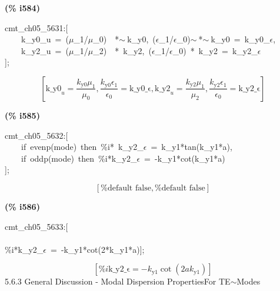 \documentclass[fleqn]{article}
\begin{document}
\noindent
\begin{minipage}[t]{4.000000em}\color{red}\bfseries
(\% i584)	
\end{minipage}
\begin{minipage}[t]{\textwidth}\color{blue}
cmt\_ch05\_5631:[\\
\ \ \ \ k\_y0\_u\ =\ (\ensuremath{\mu}\_1/\ensuremath{\mu}\_0)\ \ *\ensuremath{\sim\ }k\_y0,\ (\ensuremath{\epsilon}\_1/\ensuremath{\epsilon}\_0)\ensuremath{\sim\ }*\ensuremath{\sim\ }k\_y0\ =\ k\_y0\_\ensuremath{\epsilon},\\
\ \ \ \ k\_y2\_u\ =\ (\ensuremath{\mu}\_1/\ensuremath{\mu}\_2)\ \ *\ k\_y2,\ (\ensuremath{\epsilon}\_1/\ensuremath{\epsilon}\_0)\ *\ k\_y2\ =\ k\_y2\_\ensuremath{\epsilon}\\
];
\end{minipage}
\[\displaystyle \tag{\% o584} 
\left[ {{\ensuremath{\mathrm{k\_ y0}}}_u}=\frac{{k_{\ensuremath{\mathrm{y0}}}} {{\mu }_1}}{{{\mu }_0}}\operatorname{,}\frac{{k_{\ensuremath{\mathrm{y0}}}} {{\epsilon }_1}}{{{\epsilon }_0}}=\ensuremath{\mathrm{k\_ y0\_ \epsilon }}\operatorname{,}{{\ensuremath{\mathrm{k\_ y2}}}_u}=\frac{{k_{\ensuremath{\mathrm{y2}}}} {{\mu }_1}}{{{\mu }_2}}\operatorname{,}\frac{{k_{\ensuremath{\mathrm{y2}}}} {{\epsilon }_1}}{{{\epsilon }_0}}=\ensuremath{\mathrm{k\_ y2\_ \epsilon }}\right] \mbox{}
\]


\noindent
\begin{minipage}[t]{4.000000em}\color{red}\bfseries
(\% i585)	
\end{minipage}
\begin{minipage}[t]{\textwidth}\color{blue}
cmt\_ch05\_5632:[\\
\ \ \ \ if\ evenp(mode)\ then\ \%i*\ k\_y2\_\ensuremath{\epsilon}\ =\ k\_y1*tan(k\_y1*a),\\
\ \ \ \ if\ oddp(mode)\ then\ \%i*k\_y2\_\ensuremath{\epsilon}\ =\ -k\_y1*cot(k\_y1*a)\\
];
\end{minipage}
\[\displaystyle \tag{\% o585} 
\left[ \mbox{%
false}\operatorname{,}\mbox{%
false}\right] \mbox{}
\]


\noindent
\begin{minipage}[t]{4.000000em}\color{red}\bfseries
(\% i586)	
\end{minipage}
\begin{minipage}[t]{\textwidth}\color{blue}
cmt\_ch05\_5633:[\\
\\
\%i*k\_y2\_\ensuremath{\epsilon}\ =\ -k\_y1*cot(2*k\_y1*a)];
\end{minipage}
\[\displaystyle \tag{\% o586} 
\left[ \% i \ensuremath{\mathrm{k\_ y2\_ \epsilon }}=-{k_{\ensuremath{\mathrm{y1}}}} \cot{\left( 2 a {k_{\ensuremath{\mathrm{y1}}}}\right) }\right] \mbox{}
\]
5.6.3       General Discussion - Modal Dispersion PropertiesFor TE\ensuremath{\sim }Modes
\end{document}
